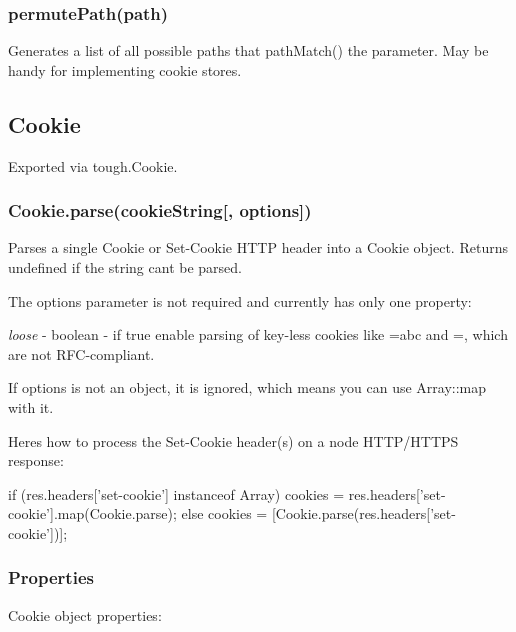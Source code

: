 \subsubsection*{{\ttfamily permute\+Path(path)}}

Generates a list of all possible paths that {\ttfamily path\+Match()} the parameter. May be handy for implementing cookie stores.

\subsection*{Cookie}

Exported via {\ttfamily tough.\+Cookie}.

\subsubsection*{{\ttfamily Cookie.\+parse(cookie\+String\mbox{[}, options\mbox{]})}}

Parses a single Cookie or Set-\/\+Cookie H\+T\+TP header into a {\ttfamily Cookie} object. Returns {\ttfamily undefined} if the string can\textquotesingle{}t be parsed.

The options parameter is not required and currently has only one property\+:


\begin{DoxyItemize}
\item {\itshape loose} -\/ boolean -\/ if {\ttfamily true} enable parsing of key-\/less cookies like {\ttfamily =abc} and {\ttfamily =}, which are not R\+F\+C-\/compliant.
\end{DoxyItemize}

If options is not an object, it is ignored, which means you can use {\ttfamily Array\+::map} with it.

Here\textquotesingle{}s how to process the Set-\/\+Cookie header(s) on a node H\+T\+T\+P/\+H\+T\+T\+PS response\+:


\begin{DoxyCode}
if (res.headers['set-cookie'] instanceof Array)
  cookies = res.headers['set-cookie'].map(Cookie.parse);
else
  cookies = [Cookie.parse(res.headers['set-cookie'])];
\end{DoxyCode}


\subsubsection*{Properties}

Cookie object properties\+:



